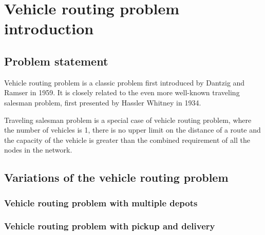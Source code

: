 \chapter{Vehicle routing problem introduction}
\label{chapter:background} 

\section{Problem statement}
Vehicle routing problem is a classic problem first introduced by Dantzig and Ramser in 1959\cite{dantzig1959truck}. It is closely related to the even more well-known traveling salesman problem, first presented by Hassler Whitney in 1934\cite{flood1956traveling}. 

Traveling salesman problem is a special case of vehicle routing problem, where the number of vehicles is 1, there is no upper limit on the distance of a route and the capacity of the vehicle is greater than the combined requirement of all the nodes in the network.



\section{Variations of the vehicle routing problem}
\subsection{Vehicle routing problem with multiple depots}
\subsection{Vehicle routing problem with pickup and delivery}
